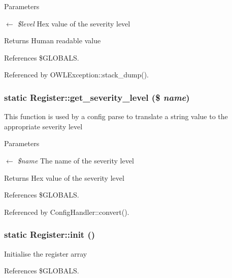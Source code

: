 \begin{DoxyParams}{Parameters}
\item[\mbox{$\leftarrow$} {\em \$level}]Hex value of the severity level \end{DoxyParams}
\begin{DoxyReturn}{Returns}
Human readable value 
\end{DoxyReturn}


References \$GLOBALS.



Referenced by OWLException::stack\_\-dump().

\subsubsection[{get\_\-severity\_\-level}]{\setlength{\rightskip}{0pt plus 5cm}static Register::get\_\-severity\_\-level (\$ {\em name})}\label{classRegister_a70490e59a4a3b910d259b8a4287c3e91}
This function is used by a config parse to translate a string value to the appropriate severity level


\begin{DoxyParams}{Parameters}
\item[\mbox{$\leftarrow$} {\em \$name}]The name of the severity level \end{DoxyParams}
\begin{DoxyReturn}{Returns}
Hex value of the severity level 
\end{DoxyReturn}


References \$GLOBALS.



Referenced by ConfigHandler::convert().

\subsubsection[{init}]{\setlength{\rightskip}{0pt plus 5cm}static Register::init ()}\label{classRegister_a5c34c30e9e6ce4dea2dbb02f55e9278a}
Initialise the register array 

References \$GLOBALS.

